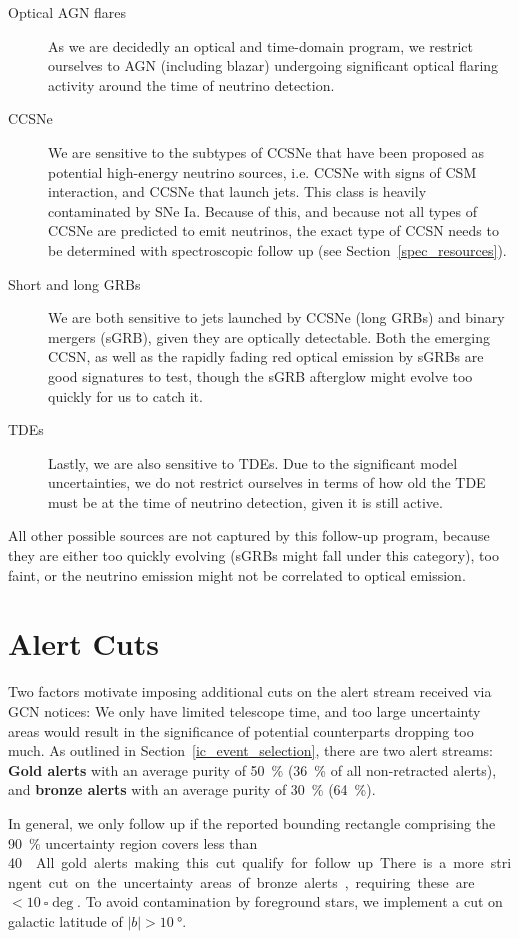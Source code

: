 \begin{description}
    \item[Optical AGN flares] As we are decidedly an optical and time-domain program, we restrict ourselves to AGN (including blazar) undergoing significant optical flaring activity around the time of neutrino detection.
    \item[CCSNe] We are sensitive to the subtypes of CCSNe that have been proposed as potential high-energy neutrino sources, i.e. CCSNe with signs of CSM interaction, and CCSNe that launch jets. This class is heavily contaminated by SNe Ia. Because of this, and because not all types of CCSNe are predicted to emit neutrinos, the exact type of CCSN needs to be determined with spectroscopic follow up (see Section~\ref{spec_resources}).
    \item[Short and long GRBs] We are both sensitive to jets launched by CCSNe (long GRBs) and binary mergers (sGRB), given they are optically detectable. Both the emerging CCSN, as well as the rapidly fading red optical emission by sGRBs are good signatures to test, though the sGRB afterglow might evolve too quickly for us to catch it.
    \item[TDEs] Lastly, we are also sensitive to TDEs. Due to the significant model uncertainties, we do not restrict ourselves in terms of how old the TDE must be at the time of neutrino detection, given it is still active.
\end{description}
All other possible sources are not captured by this follow-up program, because they are either too quickly evolving (sGRBs might fall under this category), too faint, or the neutrino emission might not be correlated to optical emission.

\section{Alert Cuts}\label{alert_cuts}
Two factors motivate imposing additional cuts on the alert stream received via GCN notices: We only have limited telescope time, and too large uncertainty areas would result in the significance of potential counterparts dropping too much. As outlined in Section~\ref{ic_event_selection}, there are two alert streams: \textbf{Gold alerts} with an average purity of \SI{50}{\percent} (\SI{36}{\percent} of all non-retracted alerts), and \textbf{bronze alerts} with an average purity of \SI{30}{\percent} (\SI{64}{\percent}).

In general, we only follow up if the reported bounding rectangle comprising the \SI{90}{\percent} uncertainty region covers less than \SI{40}{\square\deg}. All gold alerts making this cut qualify for follow up. There is a more stringent cut on the uncertainty areas of bronze alerts, requiring these are $<\SI{10}{\square\deg}$. To avoid contamination by foreground stars, we implement a cut on galactic latitude of $|b|>\SI{10}{\degree}$.

